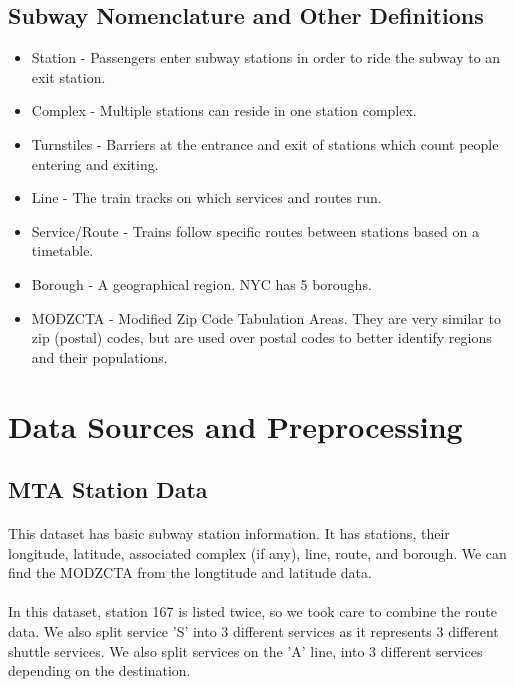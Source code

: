 \documentclass[12pt, a4, epsf] {article}
\theoremstyle{plain}
\theoremstyle{definition}
\begin{document}
\subsection{Subway Nomenclature and Other Definitions}
\begin{itemize}
    \item {Station} - Passengers enter subway stations in order to ride the subway to an exit station.
    \item {Complex} - Multiple stations can reside in one station complex.
    \item {Turnstiles} - Barriers at the entrance and exit of stations which count people entering and exiting. 
    \item {Line} - The train tracks on which services and routes run.
    \item {Service/Route} - Trains follow specific routes between stations based on a timetable. 
    \item {Borough} - A geographical region. NYC has 5 boroughs. 
    \item {MODZCTA} - Modified Zip Code Tabulation Areas. They are very similar to zip (postal) codes, but are used over postal codes to better identify regions and their populations.
\end{itemize}
\section{Data Sources and Preprocessing}
\subsection{MTA Station Data \cite{mta_stations}}
\paragraph{}
This dataset has basic subway station information. It has stations, their longitude, latitude, associated complex (if any), line, route, and borough. We can find the MODZCTA from the longtitude and latitude data.
\paragraph{}
In this dataset, station 167 is listed twice, so we took care to combine the route data. We also split service 'S' into 3 different services as it represents 3 different shuttle services. We also split services on the 'A' line, into 3 different services depending on the destination. 
\end{document}
